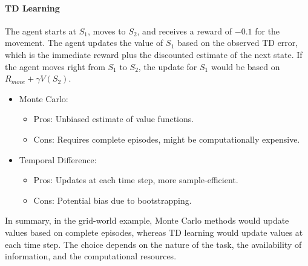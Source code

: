 \paragraph{TD Learning} The agent starts at $S_1$, moves to $S_2$, and receives a reward of $-0.1$ for the movement. The agent updates the value of $S_1$ based on the observed TD error, which is the immediate reward plus the discounted estimate of the next state. If the agent moves right from $S_1$ to $S_2$, the update for $S_1$ would be based on $R_{move}+\gamma V(S_2)$.

\begin{itemize}
	\item Monte Carlo:
		\begin{itemize}
			\item Pros: Unbiased estimate of value functions.
			\item Cons: Requires complete episodes, might be computationally expensive.
		\end{itemize}
	\item Temporal Difference:
		\begin{itemize}
			\item Pros: Updates at each time step, more sample-efficient.
			\item Cons: Potential bias due to bootstrapping.
		\end{itemize}
\end{itemize}
In summary, in the grid-world example, Monte Carlo methods would update values based on complete episodes, whereas TD learning would update values at each time step. The choice depends on the nature of the task, the availability of information, and the computational resources.

